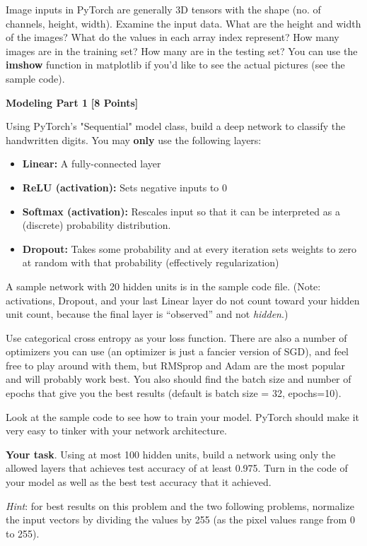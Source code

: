 Image inputs in PyTorch are generally 3D tensors with the shape (no. of channels, height, width). Examine the input data. What are the height and width of the images? What do the values in each array index represent?  How many images are in the training set? How many are in the testing set? You can use the \textbf{imshow} function in matplotlib if you'd like to see the actual pictures (see the sample code).

 \problem \textbf{Modeling Part 1} \textbf{[8 Points]}

 Using PyTorch's "Sequential" model class, build a deep network to classify the handwritten digits. You may \textbf{only} use the following layers:

 \begin{itemize}
  \item \textbf{Linear:} A fully-connected layer
  \item \textbf{ReLU (activation):} Sets negative inputs to 0
  \item \textbf{Softmax (activation):} Rescales input so that it can be interpreted as a (discrete) probability distribution.
  \item \textbf{Dropout:} Takes some probability and at every iteration sets weights to zero at random with that probability (effectively regularization)
\end{itemize}

A sample network with 20 hidden units is in the sample code file. (Note: activations, Dropout, and your last Linear layer do not count toward your hidden unit count, because the final layer is ``observed'' and not \emph{hidden}.)

Use categorical cross entropy as your loss function. There are also a number of optimizers  you can use (an optimizer is just a fancier version of SGD), and feel free to play around with them, but RMSprop and Adam are the most popular and will probably work best. You also should find the batch size and number of epochs that give you the best results (default is batch size = 32, epochs=10).

Look at the sample code to see how to train your model. PyTorch should make it very easy to tinker with your network architecture.

\textbf{Your task}. Using at most 100 hidden units, build a network using only the allowed layers that achieves test accuracy of at least 0.975. Turn in the code of your model as well as the best test accuracy that it achieved.

\textit{Hint}: for best results on this problem and the two following problems, normalize the input vectors by dividing the values by 255 (as the pixel values range from 0 to 255).


